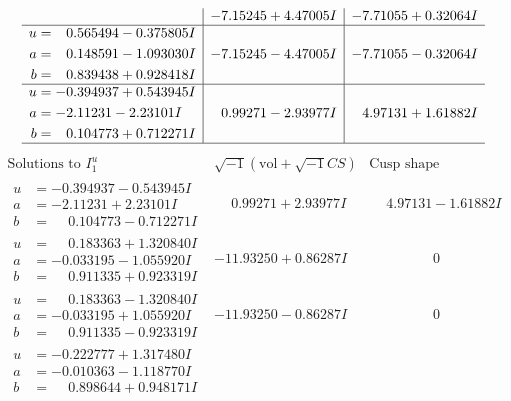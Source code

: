 \documentclass[1p]{elsarticle_modified}
\theoremstyle{definition}
\newcommand{\I}{\sqrt{-1}}
\begin{document}
$$\begin{array}{c|c|c}
 & -7.15245 + 4.47005 I & -7.71055 + 0.32064 I \\ \hline\begin{aligned}
u &= \phantom{-}0.565494 - 0.375805 I \\
a &= \phantom{-}0.148591 - 1.093030 I \\
b &= \phantom{-}0.839438 + 0.928418 I\end{aligned}
 & -7.15245 - 4.47005 I & -7.71055 - 0.32064 I \\ \hline\begin{aligned}
u &= -0.394937 + 0.543945 I \\
a &= -2.11231 - 2.23101 I \\
b &= \phantom{-}0.104773 + 0.712271 I\end{aligned}
 & \phantom{-}0.99271 - 2.93977 I & \phantom{-}4.97131 + 1.61882 I\\
 \hline 
 \end{array}$$\newpage$$\begin{array}{c|c|c}  
\text{Solutions to }I^u_{1}& \I (\text{vol} + \sqrt{-1}CS) & \text{Cusp shape}\\
 \hline 
\begin{aligned}
u &= -0.394937 - 0.543945 I \\
a &= -2.11231 + 2.23101 I \\
b &= \phantom{-}0.104773 - 0.712271 I\end{aligned}
 & \phantom{-}0.99271 + 2.93977 I & \phantom{-}4.97131 - 1.61882 I \\ \hline\begin{aligned}
u &= \phantom{-}0.183363 + 1.320840 I \\
a &= -0.033195 - 1.055920 I \\
b &= \phantom{-}0.911335 + 0.923319 I\end{aligned}
 & -11.93250 + 0.86287 I & \phantom{-0.000000 } 0 \\ \hline\begin{aligned}
u &= \phantom{-}0.183363 - 1.320840 I \\
a &= -0.033195 + 1.055920 I \\
b &= \phantom{-}0.911335 - 0.923319 I\end{aligned}
 & -11.93250 - 0.86287 I & \phantom{-0.000000 } 0 \\ \hline\begin{aligned}
u &= -0.222777 + 1.317480 I \\
a &= -0.010363 - 1.118770 I \\
b &= \phantom{-}0.898644 + 0.948171 I\end{aligned}

\end{array}$$
\end{document}
